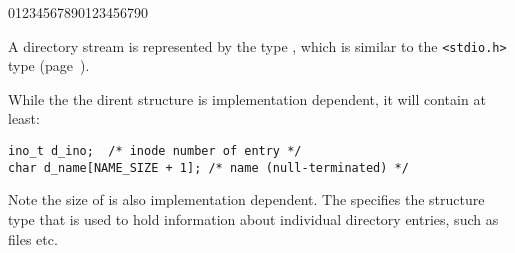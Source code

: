 \begin{Ventry2}{01234567890123456790}

\item[DIR]
\label{item:DIR}
	A directory stream is represented by the type , which
	is similar to the \verb+<stdio.h>+ type 
	(page~\pageref{item:FILE}).

\item[struct dirent]
\label{item:struct dirent}
	While the the dirent structure is implementation dependent, it
	will contain at least:

\begin{production}
\begin{verbatim}
ino_t d_ino;  /* inode number of entry */
char d_name[NAME_SIZE + 1]; /* name (null-terminated) */  
\end{verbatim}
\end{production}

Note the size of  is also implementation dependent.  The
 specifies the structure type that is  used
to hold information about individual directory entries, such as 
files etc.

\end{Ventry2}

